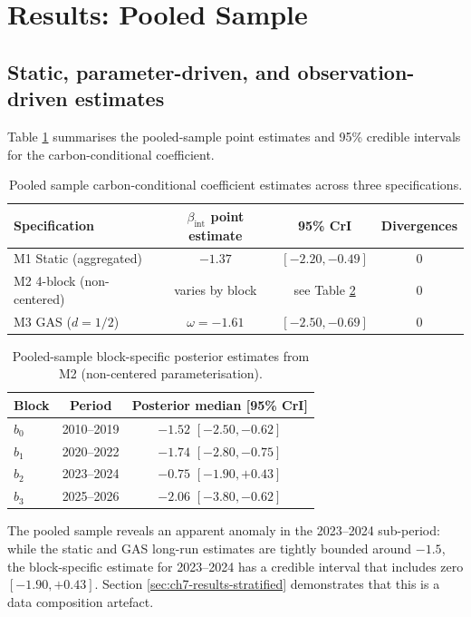 \documentclass[11pt,a4paper]{article}
\newcommand{\bint}{\beta_{\mathrm{int}}}
\begin{document}
\section{Results: Pooled Sample}
\label{sec:ch7-results-pooled}

\subsection{Static, parameter-driven, and observation-driven estimates}

Table \ref{tab:ch7-pooled} summarises the pooled-sample point estimates and 95\% credible intervals for the carbon-conditional coefficient.

\begin{table}[h!]
\centering
\caption{Pooled sample carbon-conditional coefficient estimates across three specifications.}
\begin{tabular}{lccc}
\toprule
Specification & $\bint$ point estimate & 95\% CrI & Divergences \\
\midrule
M1 Static (aggregated) & $-1.37$ & $[-2.20, -0.49]$ & 0 \\
M2 4-block (non-centered) & varies by block & see Table \ref{tab:ch7-blocks-pooled} & 0 \\
M3 GAS ($d = 1/2$) & $\omega = -1.61$ & $[-2.50, -0.69]$ & 0 \\
\bottomrule
\end{tabular}
\label{tab:ch7-pooled}
\end{table}

\begin{table}[h!]
\centering
\caption{Pooled-sample block-specific posterior estimates from M2 (non-centered parameterisation).}
\begin{tabular}{lcc}
\toprule
Block & Period & Posterior median [95\% CrI] \\
\midrule
$b_0$ & 2010--2019 & $-1.52$ $[-2.50, -0.62]$ \\
$b_1$ & 2020--2022 & $-1.74$ $[-2.80, -0.75]$ \\
$b_2$ & 2023--2024 & $-0.75$ $[-1.90, +0.43]$ \\
$b_3$ & 2025--2026 & $-2.06$ $[-3.80, -0.62]$ \\
\bottomrule
\end{tabular}
\label{tab:ch7-blocks-pooled}
\end{table}

The pooled sample reveals an apparent anomaly in the 2023--2024 sub-period: while the static and GAS long-run estimates are tightly bounded around $-1.5$, the block-specific estimate for 2023--2024 has a credible interval that includes zero $[-1.90, +0.43]$. Section \ref{sec:ch7-results-stratified} demonstrates that this is a data composition artefact.
\end{document}
